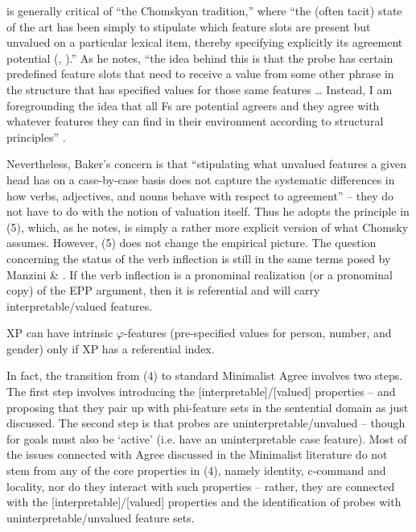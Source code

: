 \documentclass[output=paper]{langsci/langscibook}
\begin{document}
\citet[4]{Baker2008} is generally critical of “the Chomskyan tradition,” where “the (often tacit) state of the art has been simply to stipulate which feature slots are present but unvalued on a particular lexical item, thereby specifying explicitly its agreement potential (\citealt{Chomsky2000}, \citealt{Chomsky2001}).” As he notes, “the idea behind this is that the probe has certain predefined feature slots that need to receive a value from some other phrase in the structure that has specified values for those same features … Instead, I am foregrounding the idea that all Fs are potential agreers and they agree with whatever features they can find in their environment according to structural principles” \citep[44]{Baker2008}.{}  

Nevertheless, Baker’s concern is that “stipulating what unvalued features a given head has on a case-by-case basis does not capture the systematic differences in how verbs, adjectives, and nouns behave with respect to agreement” – they do not have to do with the notion of valuation itself. Thus he adopts the principle in (5), which, as he notes, is simply a rather more explicit version of what Chomsky assumes. However, (5) does not change the empirical picture. The question concerning the status of the verb inflection is still in the same terms posed by Manzini \& \citet{Savoia2007}. If the verb inflection is a pronominal realization (or a pronominal copy) of the EPP argument, then it is referential and will carry interpretable/valued features.

\ea%
    \label{ex:manzini:5}
    XP can have intrinsic $\varphi $-features (pre-specified values for person, number, and gender) only if XP has a referential index.
    \z

           

In fact, the transition from (4) to standard Minimalist Agree involves two steps. The first step involves introducing the [interpretable]/[valued] properties – and proposing that they pair up with phi-feature sets in the sentential domain as just discussed. The second step is that probes are uninterpretable/unvalued – though for \citet{Chomsky2001} goals must also be ‘active’ (i.e. have an uninterpretable case feature). Most of the issues connected with Agree discussed in the Minimalist literature do not stem from any of the core properties in (4), namely identity, c-command and locality, nor do they interact with such properties – rather, they are connected with the [interpretable]/[valued] properties and the identification of probes with uninterpretable/unvalued feature sets. 
\end{document}
